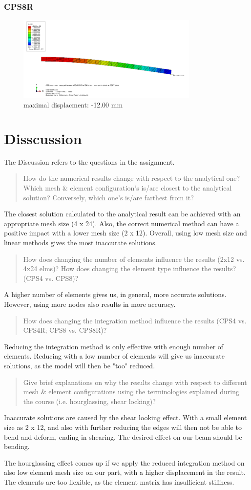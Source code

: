 \documentclass[12pt]{article}
\begin{document}
\subsubsection{CPS8R}
\begin{figure}[!htb]
  \centering
  \includegraphics[width=0.8\textwidth]{pics/4_24_CPS8R}
  \caption{maximal displacment: -12.00 mm}
\end{figure}
\FloatBarrier
\pagebreak
\section{Disscussion}
The Discussion refers to the questions in the assignment.
\begin{quote}
How do the numerical results change with respect to the analytical
one? Which mesh \& element configuration's is/are closest to the
analytical solution? Conversely, which one's is/are farthest from it?
\end{quote}
The closest solution calculated to the analytical result can be 
achieved with an appropriate mesh size (4 x 24).  Also, the correct 
numerical method can have a positive impact with a lower mesh size (2 x 12). 
Overall, using low mesh size and linear methods gives the most inaccurate solutions.
\begin{quote}
How does changing the number of elements influence the results
(2x12 vs. 4x24 elms)?
How does changing the element type influence the results? (CPS4
vs. CPS8)?
\end{quote}
A higher number of elements gives us, in general, more accurate solutions. However, 
using more nodes also results in more accuracy.
\begin{quote}
How does changing 
the integration method 
influence the results
(CPS4 vs. CPS4R; CPS8 vs. CPS8R)?
\end{quote}
Reducing the integration method is only effective with enough number of elements. 
Reducing with a low number of elements will give us inaccurate solutions, as the 
model will then be "too" reduced.
\begin{quote}
Give brief explanations on why the results change with respect to
different mesh \& element configurations using the terminologies
explained during the course (i.e. hourglassing, shear locking)?
\end{quote}
Inaccurate solutions are caused by the shear looking effect. With a 
small element size as 2 x 12, and also with further reducing the edges 
will then not be able to bend and deform, ending in shearing. The 
desired effect on our beam should be bending.

The hourglassing effect comes up if we apply the reduced integration 
method on also low element mesh size on our part, with a higher 
displacement in the result. The elements are too flexible, as 
the element matrix has insufficient stiffness.
\end{document}
